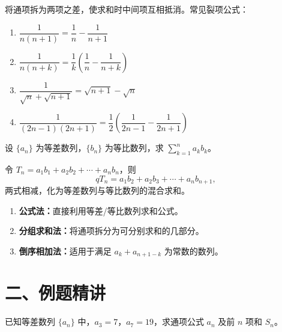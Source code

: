\documentclass[12pt, a4paper]{ctexart}
\begin{document}
\begin{knowledgebox}[裂项相消法]
将通项拆为两项之差，使求和时中间项互相抵消。常见裂项公式：
\begin{enumerate}[label=(\arabic*)]
  \item $\dfrac{1}{n(n+1)} = \dfrac{1}{n} - \dfrac{1}{n+1}$
  \item $\dfrac{1}{n(n+k)} = \dfrac{1}{k}\!\left(\dfrac{1}{n} - \dfrac{1}{n+k}\right)$
  \item $\dfrac{1}{\sqrt{n} + \sqrt{n+1}} = \sqrt{n+1} - \sqrt{n}$
  \item $\dfrac{1}{(2n-1)(2n+1)} = \dfrac{1}{2}\!\left(\dfrac{1}{2n-1} - \dfrac{1}{2n+1}\right)$
\end{enumerate}
\end{knowledgebox}

\begin{knowledgebox}[错位相减法]
设 $\{a_n\}$ 为等差数列，$\{b_n\}$ 为等比数列，求 $\displaystyle\sum_{k=1}^{n} a_k b_k$。

令 $T_n = a_1 b_1 + a_2 b_2 + \cdots + a_n b_n$，则
\[
  q T_n = a_1 b_2 + a_2 b_3 + \cdots + a_n b_{n+1},
\]
两式相减，化为等差数列与等比数列的混合求和。
\end{knowledgebox}

\begin{knowledgebox}[其他常用求和方法]
\begin{enumerate}[label=(\arabic*)]
  \item \textbf{公式法：}直接利用等差/等比数列求和公式。
  \item \textbf{分组求和法：}将通项拆分为可分别求和的几部分。
  \item \textbf{倒序相加法：}适用于满足 $a_k + a_{n+1-k}$ 为常数的数列。
\end{enumerate}
\end{knowledgebox}

\section*{\textcolor{examorange}{二、例题精讲}}

\begin{examplebox}[【例题1】等差数列基本运算]
已知等差数列 $\{a_n\}$ 中，$a_3 = 7$，$a_7 = 19$，求通项公式 $a_n$ 及前 $n$ 项和 $S_n$。
\end{examplebox}
\end{document}

